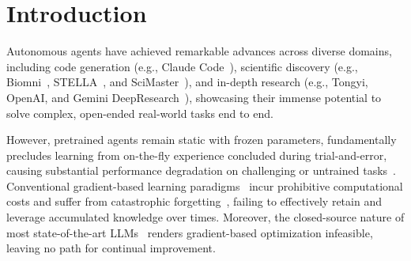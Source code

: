 \section{Introduction}
Autonomous agents have achieved remarkable advances across diverse domains, including code generation (e.g., Claude Code~\cite{anthropic2025claude}), scientific discovery (e.g., Biomni~\cite{huang2025biomni}, STELLA~\cite{jin2025stellaselfevolvingllmagent}, and SciMaster~\cite{chai2025scimastergeneralpurposescientificai}), and in-depth research (e.g., Tongyi, OpenAI, and Gemini DeepResearch~\cite{tongyidr,openai2025deepresearch,google2025gemini}), showcasing their immense potential to solve complex, open-ended real-world tasks end to end. 

However, pretrained agents remain static with frozen parameters, fundamentally precludes learning from on-the-fly experience concluded during trial-and-error, causing substantial performance degradation on challenging or untrained tasks~\cite{wu2023autogen,liu2023agentbench}.
Conventional gradient-based learning paradigms~\cite{rumelhart1986learning,ruder2016overview,hu2022lora} incur prohibitive computational costs and suffer from catastrophic forgetting~\cite{abbas2023loss,hadi2023large,goodfellow2013empirical}, failing to effectively retain and leverage accumulated knowledge over times. 
Moreover, the closed-source nature of most state-of-the-art LLMs~\cite{google2025gemini2_5_pro,openai2025gpt5,anthropic2025sonnet4.5,anthropic2025claude4,xai2025grok4} renders gradient-based optimization infeasible, leaving no path for continual improvement.


